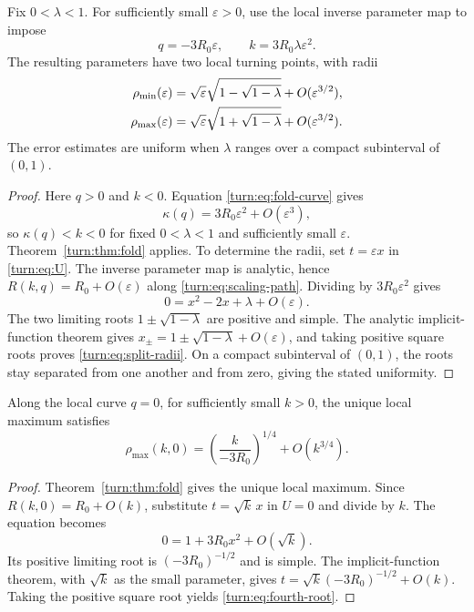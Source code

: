 \begin{corollary}
\label{turn:cor:splitting}
Fix $0<\lambda<1$.  For sufficiently small $\varepsilon>0$, use the
local inverse parameter map to impose
\begin{equation}
 q=-3R_0\varepsilon,\qquad
 k=3R_0\lambda\varepsilon^2.
 \label{turn:eq:scaling-path}
\end{equation}
The resulting parameters have two local turning points, with radii
\begin{align}
 \rho_{\min}(\varepsilon)
 &=\sqrt{\varepsilon}\sqrt{1-\sqrt{1-\lambda}}
      +O(\varepsilon^{3/2}),\notag\\
 \rho_{\max}(\varepsilon)
 &=\sqrt{\varepsilon}\sqrt{1+\sqrt{1-\lambda}}
      +O(\varepsilon^{3/2}).
 \label{turn:eq:split-radii}
\end{align}
The error estimates are uniform when $\lambda$ ranges over a compact
subinterval of $(0,1)$.
\end{corollary}

\begin{proof}
Here $q>0$ and $k<0$.  Equation \eqref{turn:eq:fold-curve} gives
\[
 \kappa(q)=3R_0\varepsilon^2+O(\varepsilon^3),
\]
so $\kappa(q)<k<0$ for fixed $0<\lambda<1$ and sufficiently small
$\varepsilon$.  Theorem~\ref{turn:thm:fold} applies.  To determine the
radii, set $t=\varepsilon x$ in \eqref{turn:eq:U}.  The inverse
parameter map is analytic, hence $R(k,q)=R_0+O(\varepsilon)$ along
\eqref{turn:eq:scaling-path}.  Dividing by $3R_0\varepsilon^2$ gives
\[
 0=x^2-2x+\lambda+O(\varepsilon).
\]
The two limiting roots $1\pm\sqrt{1-\lambda}$ are positive and
simple.  The analytic implicit-function theorem gives
$x_\pm=1\pm\sqrt{1-\lambda}+O(\varepsilon)$, and taking positive
square roots proves \eqref{turn:eq:split-radii}.  On a compact
subinterval of $(0,1)$, the roots stay separated from one another and
from zero, giving the stated uniformity.
\end{proof}

\begin{corollary}
\label{turn:cor:fourth-root}
Along the local curve $q=0$, for sufficiently small $k>0$, the unique
local maximum satisfies
\begin{equation}
 \rho_{\max}(k,0)
 =\left(\frac{k}{-3R_0}\right)^{1/4}+O(k^{3/4}).
 \label{turn:eq:fourth-root}
\end{equation}
\end{corollary}

\begin{proof}
Theorem~\ref{turn:thm:fold} gives the unique local maximum.  Since
$R(k,0)=R_0+O(k)$, substitute $t=\sqrt{k}\,x$ in $U=0$ and divide by
$k$.  The equation becomes
\[
 0=1+3R_0x^2+O(\sqrt{k}).
\]
Its positive limiting root is $(-3R_0)^{-1/2}$ and is simple.  The
implicit-function theorem, with $\sqrt{k}$ as the small parameter,
gives $t=\sqrt{k}(-3R_0)^{-1/2}+O(k)$.  Taking the positive square
root yields \eqref{turn:eq:fourth-root}.
\end{proof}

